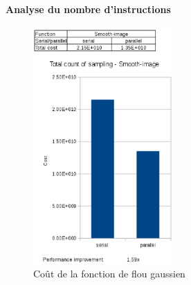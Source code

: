 \documentclass[10pt]{report}
\begin{document}
		\paragraph{Analyse du nombre d'instructions}
%		
		\begin{figure}
			\includegraphics[height=9cm]{Reports/figures/smooth_image_costs.eps}
			\caption{Coût de la fonction de flou gaussien}
			\label{Coût de la fonction de flou gaussien}
		\end{figure}
\end{document}
